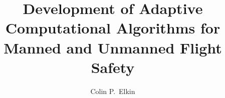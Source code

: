 \documentclass[12pt]{uthesis-v12}  %
\begin{document}


\title{Development of Adaptive Computational Algorithms for Manned and Unmanned Flight Safety}

\author{Colin P.~Elkin}



\end{document}
